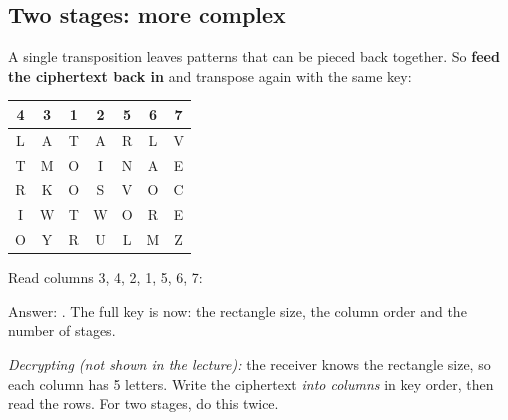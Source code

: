 \subsection{Two stages: more complex}
A single transposition leaves patterns that can be pieced back together. So \textbf{feed the ciphertext back in} and transpose again with the same key:
\begin{center}\small
\begin{minipage}[c]{0.4\textwidth}\centering
\begin{tabular}{|*{7}{c|}}
\multicolumn{1}{c}{4}&\multicolumn{1}{c}{3}&\multicolumn{1}{c}{\textbf{1}}&\multicolumn{1}{c}{2}&\multicolumn{1}{c}{5}&\multicolumn{1}{c}{6}&\multicolumn{1}{c}{7}\\
\hline
L&A&\cellcolor{warn!18}T&A&R&L&V\\ \hline
T&M&\cellcolor{warn!18}O&I&N&A&E\\ \hline
R&K&\cellcolor{warn!18}O&S&V&O&C\\ \hline
I&W&\cellcolor{warn!18}T&W&O&R&E\\ \hline
O&Y&\cellcolor{warn!18}R&U&L&M&Z\\ \hline
\end{tabular}
\end{minipage}
\begin{minipage}[c]{0.5\textwidth}
Read columns 3, 4, 2, 1, 5, 6, 7:\\[2pt]
\end{minipage}
\end{center}
Answer: \textbf{}.
The full key is now: the rectangle size, the column order and the number of stages.

{\small\emph{Decrypting (not shown in the lecture):} the receiver knows the rectangle size, so each column has 5 letters. Write the ciphertext \emph{into columns} in key order, then read the rows. For two stages, do this twice.}

